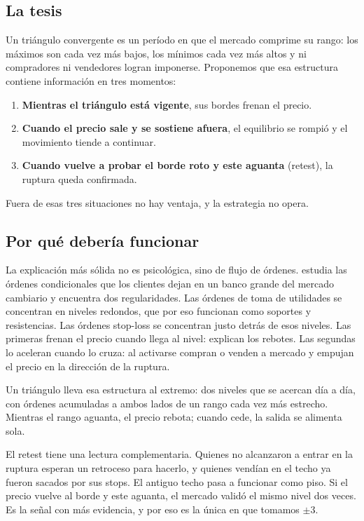 \documentclass[10pt,a4paper]{article}
\begin{document}
\subsection{La tesis}

Un triángulo convergente es un período en que el mercado comprime su rango: los
máximos son cada vez más bajos, los mínimos cada vez más altos y ni compradores ni
vendedores logran imponerse. Proponemos que esa estructura contiene información en tres
momentos:
\begin{enumerate}
  \item \textbf{Mientras el triángulo está vigente}, sus bordes frenan el precio.
  \item \textbf{Cuando el precio sale y se sostiene afuera}, el equilibrio se rompió y
        el movimiento tiende a continuar.
  \item \textbf{Cuando vuelve a probar el borde roto y este aguanta} (retest), la
        ruptura queda confirmada.
\end{enumerate}
Fuera de esas tres situaciones no hay ventaja, y la estrategia no opera.

\subsection{Por qué debería funcionar}

La explicación más sólida no es psicológica, sino de flujo de órdenes.
\citet{osler2003} estudia las órdenes condicionales que los clientes dejan en un banco
grande del mercado cambiario y encuentra dos regularidades. Las órdenes de toma de
utilidades se concentran en niveles redondos, que por eso funcionan como soportes y
resistencias. Las órdenes stop-loss se concentran justo detrás de esos niveles. Las
primeras frenan el precio cuando llega al nivel: explican los rebotes. Las segundas lo
aceleran cuando lo cruza: al activarse compran o venden a mercado y empujan el precio en
la dirección de la ruptura.

Un triángulo lleva esa estructura al extremo: dos niveles que se acercan día a día, con
órdenes acumuladas a ambos lados de un rango cada vez más estrecho. Mientras el rango
aguanta, el precio rebota; cuando cede, la salida se alimenta sola.

El retest tiene una lectura complementaria. Quienes no alcanzaron a entrar en la
ruptura esperan un retroceso para hacerlo, y quienes vendían en el techo ya fueron
sacados por sus stops. El antiguo techo pasa a funcionar como piso. Si el precio vuelve
al borde y este aguanta, el mercado validó el mismo nivel dos veces. Es la señal con más
evidencia, y por eso es la única en que tomamos $\pm3$.
\end{document}
